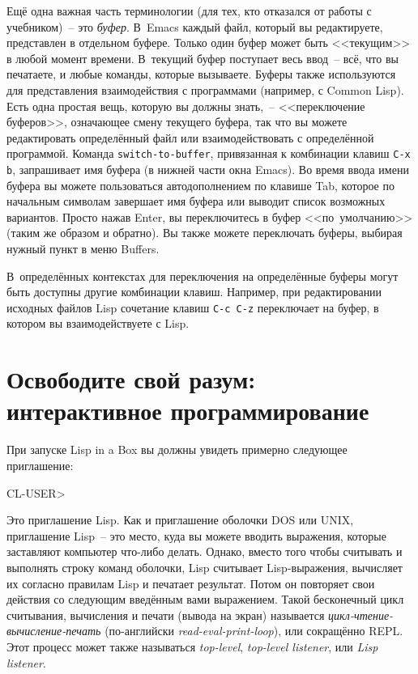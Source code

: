 Ещё одна важная часть терминологии (для тех, кто отказался от работы с учебником)~-- это
\emph{буфер}. В~Emacs каждый файл, который вы редактируете, представлен в
отдельном буфере. Только один буфер может быть <<текущим>> в любой момент времени. В~текущий
буфер поступает весь ввод~-- всё, что вы печатаете, и любые команды, которые
вызываете. Буферы также используются для представления взаимодействия с программами
(например, с Common Lisp). Есть одна простая вещь, которую вы должны знать,~-- <<переключение
буферов>>, означающее смену текущего буфера, так что вы можете редактировать определённый
файл или взаимодействовать с определённой программой. Команда \texttt{switch-to-buffer},
привязанная к комбинации клавиш \texttt{C-x b}, запрашивает имя буфера (в нижней части окна
Emacs). Во время ввода имени буфера вы можете пользоваться автодополнением по клавише
Tab, которое по начальным символам завершает имя буфера или выводит список возможных
вариантов. Просто нажав Enter, вы переключитесь в буфер <<по~умолчанию>> (таким же образом и
обратно). Вы также можете переключать буферы, выбирая нужный пункт в меню Buffers.

В~определённых контекстах для переключения на определённые буферы могут быть доступны
другие комбинации клавиш. Например, при редактировании исходных файлов Lisp сочетание
клавиш \texttt{C-c C-z} переключает на буфер, в котором вы вза\-и\-мо\-дей\-ству\-е\-те с Lisp.

\section{Освободите свой разум: интерактивное программирование}

При запуске Lisp in a Box вы должны увидеть примерно следующее приглашение:

\begin{myverb}
CL-USER>
\end{myverb}

Это приглашение Lisp. Как и приглашение оболочки DOS или UNIX, приглашение Lisp~-- это
место, куда вы можете вводить выражения, которые заставляют компьютер что-либо делать.
Однако, вместо того чтобы считывать и выполнять строку команд оболочки, Lisp
считывает Lisp-выражения, вычисляет их согласно правилам Lisp и печатает результат. Потом
он повторяет свои действия со следующим введённым вами выражением. Такой бесконечный цикл
считывания, вычисления и печати (вывода на экран) называется
\emph{цикл-чтение-вычисление-печать} (по-английски \emph{read-eval-print-loop}), или
сокращённо REPL. Этот процесс может также называться \emph{top-level},
\emph{top-level listener}, или \emph{Lisp listener}.

